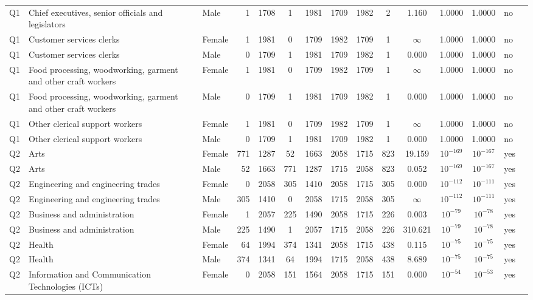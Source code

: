 \begin{longtable}{lllrcccccccccll}
Q1 & Chief executives, senior officials and legislators & Male & 1 & 1708 & 1 & 1981 & 1709 & 1982 & 2 & 1.160 & 1.0000 & 1.0000 & no \\
Q1 & Customer services clerks & Female & 1 & 1981 & 0 & 1709 & 1982 & 1709 & 1 & $\infty$ & 1.0000 & 1.0000 & no \\
Q1 & Customer services clerks & Male & 0 & 1709 & 1 & 1981 & 1709 & 1982 & 1 & 0.000 & 1.0000 & 1.0000 & no \\
Q1 & Food processing, woodworking, garment and other craft workers & Female & 1 & 1981 & 0 & 1709 & 1982 & 1709 & 1 & $\infty$ & 1.0000 & 1.0000 & no \\
Q1 & Food processing, woodworking, garment and other craft workers & Male & 0 & 1709 & 1 & 1981 & 1709 & 1982 & 1 & 0.000 & 1.0000 & 1.0000 & no \\
Q1 & Other clerical support workers & Female & 1 & 1981 & 0 & 1709 & 1982 & 1709 & 1 & $\infty$ & 1.0000 & 1.0000 & no \\
Q1 & Other clerical support workers & Male & 0 & 1709 & 1 & 1981 & 1709 & 1982 & 1 & 0.000 & 1.0000 & 1.0000 & no \\
Q2 & Arts & Female & 771 & 1287 & 52 & 1663 & 2058 & 1715 & 823 & 19.159 & $10^{-169}$ & $10^{-167}$ & yes \\
Q2 & Arts & Male & 52 & 1663 & 771 & 1287 & 1715 & 2058 & 823 & 0.052 & $10^{-169}$ & $10^{-167}$ & yes \\
Q2 & Engineering and engineering trades & Female & 0 & 2058 & 305 & 1410 & 2058 & 1715 & 305 & 0.000 & $10^{-112}$ & $10^{-111}$ & yes \\
Q2 & Engineering and engineering trades & Male & 305 & 1410 & 0 & 2058 & 1715 & 2058 & 305 & $\infty$ & $10^{-112}$ & $10^{-111}$ & yes \\
Q2 & Business and administration & Female & 1 & 2057 & 225 & 1490 & 2058 & 1715 & 226 & 0.003 & $10^{-79}$ & $10^{-78}$ & yes \\
Q2 & Business and administration & Male & 225 & 1490 & 1 & 2057 & 1715 & 2058 & 226 & 310.621 & $10^{-79}$ & $10^{-78}$ & yes \\
Q2 & Health & Female & 64 & 1994 & 374 & 1341 & 2058 & 1715 & 438 & 0.115 & $10^{-75}$ & $10^{-75}$ & yes \\
Q2 & Health & Male & 374 & 1341 & 64 & 1994 & 1715 & 2058 & 438 & 8.689 & $10^{-75}$ & $10^{-75}$ & yes \\
Q2 & Information and Communication Technologies (ICTs) & Female & 0 & 2058 & 151 & 1564 & 2058 & 1715 & 151 & 0.000 & $10^{-54}$ & $10^{-53}$ & yes \\

\end{longtable}
